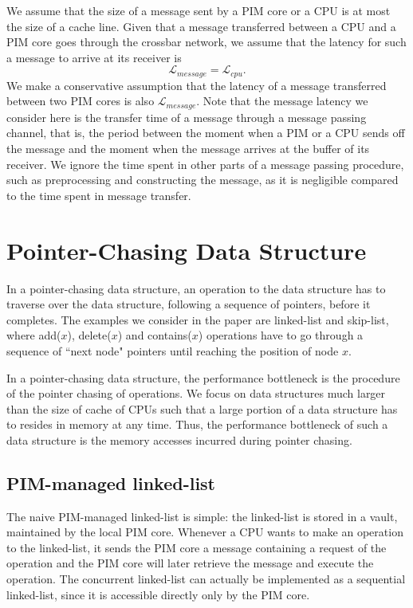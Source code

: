\documentclass[11pt]{article}
\newcommand{\latcpu} {\mathcal{L}_{cpu}}
\newcommand{\latmes} {\mathcal{L}_{message}}
\begin{document}
We assume that the size of a message sent by a PIM core or a CPU is at most 
the size of a cache line.
Given that a message transferred between a CPU and a PIM core goes through
the crossbar network, we assume that the latency for such a message to
arrive at its receiver is 
$$\latmes = \latcpu.$$
We make a conservative assumption that the latency of a message transferred 
between two PIM cores is also $\latmes$.
Note that the message latency we consider here is the transfer time of a message
through a message passing channel, that is, the period between the moment
when a PIM or a CPU sends off the message and the moment when
the message arrives at the buffer of its receiver.
We ignore the time spent in other parts of a message passing procedure,
such as preprocessing and constructing the message,
as it is negligible compared to the time spent in message transfer.


\section{Pointer-Chasing Data Structure}
\label{section:pointer_chasing}
In a pointer-chasing data structure, an operation to the data structure has to 
traverse over the data structure, following a sequence of pointers, before it completes.
The examples we consider in the paper are linked-list and skip-list,
where add($x$), delete($x$) and contains($x$) operations have to go through
a sequence of ``next node" pointers until reaching the position of node $x$.

In a pointer-chasing data structure,
the performance bottleneck is the procedure of the pointer chasing of operations.
We focus on data structures much larger than the size of cache of CPUs
such that a large portion of a data structure has to resides in memory at any time.
Thus, the performance bottleneck of such a data structure is
the memory accesses incurred during pointer chasing.


\subsection{PIM-managed linked-list}
\label{section:linked_list}
The naive PIM-managed linked-list is simple:
the linked-list is stored in a vault, maintained by the local PIM core.
Whenever a CPU wants to make an operation to the linked-list,
it sends the PIM core a message containing a request of the operation
and the PIM core will later retrieve the message and execute the operation.
The concurrent linked-list can actually be implemented
as a sequential linked-list, since it is accessible directly only by the PIM core.
\end{document}
